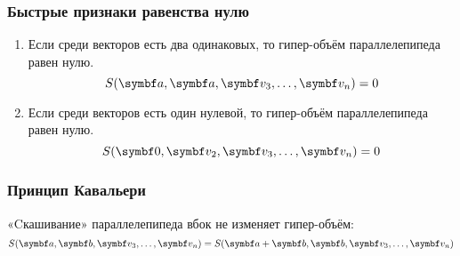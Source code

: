 \begin{frame}
    \frametitle{Быстрые признаки равенства нулю}

    \begin{enumerate}
        \item Если среди векторов есть два одинаковых, то 
        гипер-объём параллелепипеда равен нулю. 
        \[
            S(\ba, \ba, \bv_3, \ldots, \bv_n) = 0
        \]
        \pause
        \item Если среди векторов есть один нулевой, то 
        гипер-объём параллелепипеда равен нулю. 
        \[
            S(\bzero, \bv_2, \bv_3, \ldots, \bv_n) = 0
        \]
        \end{enumerate}

\end{frame}

\begin{frame}
\frametitle{Принцип Кавальери}

        «Cкашивание» параллелепипеда вбок не изменяет гипер-объём:
        \[
            S(\ba, \bb, \bv_3, \ldots, \bv_n) = S(\ba + \bb, \bb, \bv_3, \ldots, \bv_n)
        \]
    \pause
    \begin{center}
\end{center}
\end{frame}
